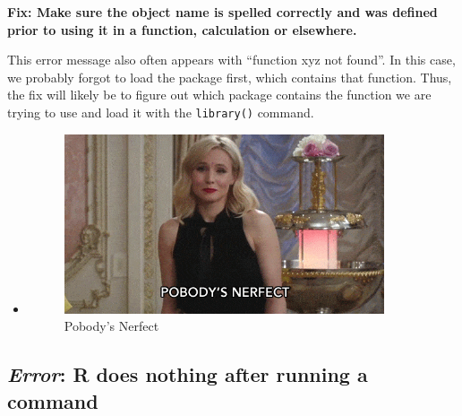 \documentclass[
]{book}
\begin{document}
\textbf{Fix: Make sure the object name is spelled correctly and was defined prior to using it in a function, calculation or elsewhere.}

This error message also often appears with ``function xyz not found''.
In this case, we probably forgot to load the package first, which contains that function.
Thus, the fix will likely be to figure out which package contains the function we are trying to use and load it with the \texttt{library()} command.

\begin{itemize}
\item
  \begin{figure}
  \centering
  \includegraphics[width=\textwidth,height=2.08333in]{./img/nerfect.webp}
  \caption{Pobody's Nerfect}\label{id}
  \end{figure}
\end{itemize}

\subsection{\texorpdfstring{\emph{Error}: R does nothing after running a command}{Error: R does nothing after running a command}}\label{error-r-does-nothing-after-running-a-command}
\end{document}
